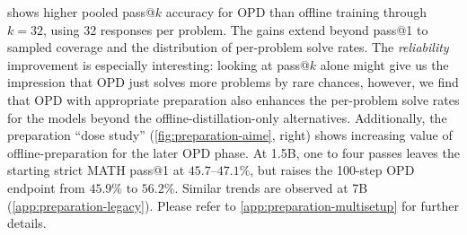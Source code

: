  shows higher pooled pass@$k$ accuracy for OPD than offline training through $k=32$, using 32 responses per problem. The gains extend beyond pass@1 to sampled coverage and the distribution of per-problem solve rates. The \emph{reliability} improvement is especially interesting: looking at pass@$k$ alone might give us the impression that OPD just solves more problems by rare chances, however, we find that OPD with appropriate preparation also enhances the per-problem solve rates for the models beyond the offline-distillation-only alternatives. Additionally, the preparation ``dose study'' (\cref{fig:preparation-aime}, right) shows increasing value of offline-preparation for the later OPD phase. At 1.5B, one to four passes leaves the starting strict MATH pass@1 at $45.7$--$47.1\%$, but raises the 100-step OPD endpoint from $45.9\%$ to $56.2\%$. Similar trends are observed at 7B (\cref{app:preparation-legacy}). Please refer to \cref{app:preparation-multisetup} for further details.

